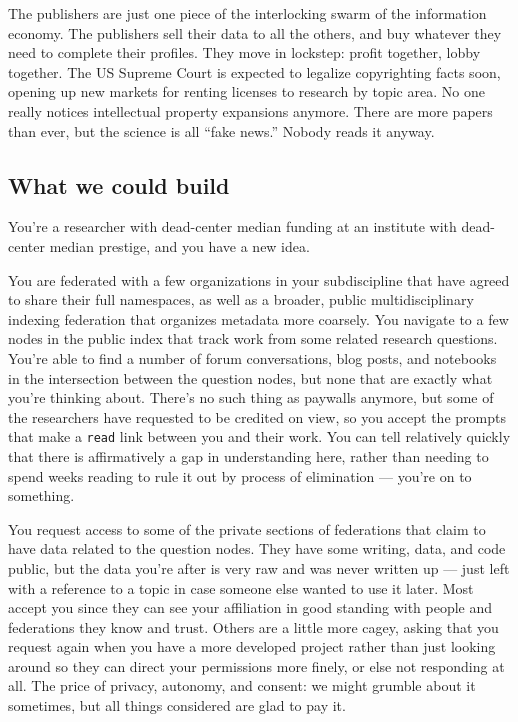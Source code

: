 The publishers are just one piece of the interlocking swarm of the
information economy. The publishers sell their data to all the others,
and buy whatever they need to complete their profiles. They move in
lockstep: profit together, lobby together. The US Supreme Court is
expected to legalize copyrighting facts soon, opening up new markets for
renting licenses to research by topic area. No one really notices
intellectual property expansions anymore. There are more papers than
ever, but the science is all ``fake news.'' Nobody reads it anyway.

\hypertarget{what-we-could-build}{%
\subsection{What we could build}\label{what-we-could-build}}

You're a researcher with dead-center median funding at an institute with
dead-center median prestige, and you have a new idea.

You are federated with a few organizations in your subdiscipline that
have agreed to share their full namespaces, as well as a broader, public
multidisciplinary indexing federation that organizes metadata more
coarsely. You navigate to a few nodes in the public index that track
work from some related research questions. You're able to find a number
of forum conversations, blog posts, and notebooks in the intersection
between the question nodes, but none that are exactly what you're
thinking about. There's no such thing as paywalls anymore, but some of
the researchers have requested to be credited on view, so you accept the
prompts that make a \texttt{read} link between you and their work. You
can tell relatively quickly that there is affirmatively a gap in
understanding here, rather than needing to spend weeks reading to rule
it out by process of elimination --- you're on to something.

You request access to some of the private sections of federations that
claim to have data related to the question nodes. They have some
writing, data, and code public, but the data you're after is very raw
and was never written up --- just left with a reference to a topic in
case someone else wanted to use it later. Most accept you since they can
see your affiliation in good standing with people and federations they
know and trust. Others are a little more cagey, asking that you request
again when you have a more developed project rather than just looking
around so they can direct your permissions more finely, or else not
responding at all. The price of privacy, autonomy, and consent: we might
grumble about it sometimes, but all things considered are glad to pay
it.

